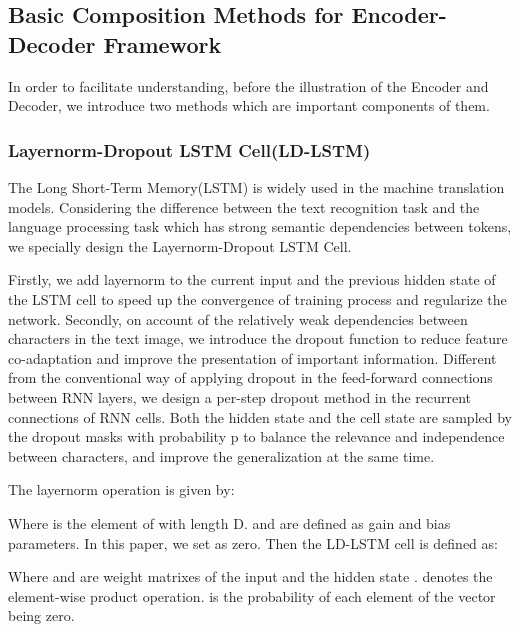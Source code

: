 \documentclass[runningheads]{llncs}
\begin{document}
\subsection{Basic Composition Methods for Encoder-Decoder Framework}
In order to facilitate understanding, before the illustration of the Encoder and Decoder, we introduce two methods which are important components of them. 
\subsubsection{Layernorm-Dropout LSTM Cell(LD-LSTM)}
The Long Short-Term Memory(LSTM) \cite{hochreiter1997long} is widely used in the machine translation models\cite{bahdanau2014neural}. Considering the difference between the text recognition task and the language processing task which has strong semantic dependencies between tokens, we specially design the Layernorm-Dropout LSTM Cell.

Firstly, we add layernorm\cite{ba2016layer} to the current input and the previous hidden state of the LSTM cell to speed up the convergence of training process and regularize the network. Secondly, on account of the relatively weak dependencies between characters in the text image, we introduce the dropout function\cite{hinton2012improving} to reduce feature co-adaptation and improve the presentation of important information. Different from the conventional way of applying dropout in the feed-forward connections between RNN layers\cite{zaremba2014recurrent}, we design a per-step dropout method in the recurrent connections of RNN cells. Both the hidden state and the cell state are sampled by the dropout masks with probability p to balance the relevance and independence between characters, and improve the generalization at the same time. 

The layernorm operation is given by:



Where  is the  element of  with length D.  and  are defined as gain and bias parameters. In this paper, we set  as zero. Then the LD-LSTM cell is defined as:




Where  and  are weight matrixes of the input  and the hidden state .  denotes the element-wise product operation.  is the probability of each element of the vector being zero.
\end{document}
